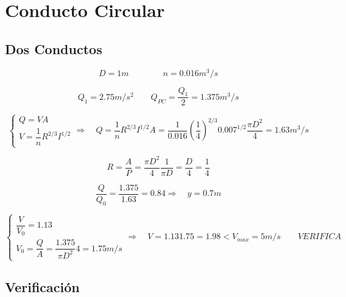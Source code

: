 \section*{Conducto Circular}

\subsection*{Dos Conductos}

\begin{equation*}
  D = 1 m
 \qquad
 \qquad
  n = 0.016 m^3/s
\end{equation*}

\begin{equation*}
  Q_{1} = 2.75 m/s^{2}
 \qquad
  Q_{PC} = \dfrac{Q_{1}}{2} = 1.375 m^{3}/s
\end{equation*}

\begin{equation*}
  \begin{cases}
    Q = V A \\
    V = \dfrac{1}{n} R^{2/3} I^{1/2}
  \end{cases}
  \Longrightarrow \quad
  Q = \dfrac{1}{n} R^{2/3} I^{1/2} A = \dfrac{1}{0.016} (\dfrac{1}{4})^{2/3} 0.007^{1/2} \dfrac{\pi D^{2}}{4} = 1.63 m^{3}/s
\end{equation*}

\begin{equation*}
  R = \dfrac{A}{P} = \dfrac{\pi D^{2}}{4} \dfrac{1}{\pi D} = \dfrac{D}{4} = \dfrac{1}{4}
\end{equation*}

\begin{equation*}
  \dfrac{Q}{Q_{0}} = \dfrac{1.375}{1.63} = 0.84
  \Longrightarrow \quad
  y = 0.7 m
\end{equation*}

\begin{equation*}
  \begin{cases}
    \dfrac{V}{V_{0}} = 1.13 \\
    V_{0} = \dfrac{Q}{A} = \dfrac{1.375}{\pi D^{2}} 4 = 1.75 m/s
  \end{cases}
  \Longrightarrow \quad
  V = 1.13 1.75 = 1.98 < V_{max} = 5 m/s
  \qquad
  VERIFICA
\end{equation*}



\subsection*{Verificación}

